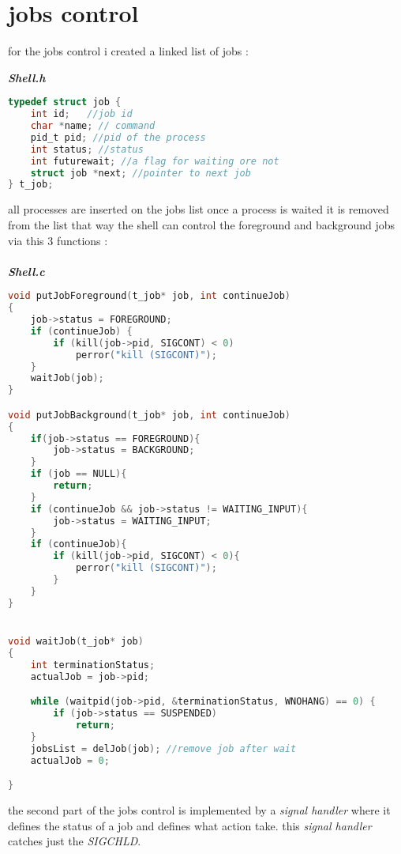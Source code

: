 \documentclass[paper=a4, fontsize=11pt]{scrartcl}
\numberwithin{equation}{section}		%
\numberwithin{figure}{section}			%
\numberwithin{table}{section}				%
\begin{document}
\pagebreak

\section{jobs control}
	
for the jobs control i created a linked list of jobs :


\textbf{\emph{Shell.h}}
\begin{lstlisting}[language=c]
typedef struct job {
	int id;   //job id
	char *name; // command
	pid_t pid; //pid of the process
	int status; //status
	int futurewait; //a flag for waiting ore not
	struct job *next; //pointer to next job
} t_job;
\end{lstlisting}

all processes are inserted on the jobs list once a process is waited it is removed from the list
that way the shell can control the foreground and background jobs via this 3 functions :
\\
\\

\textbf{\emph{Shell.c}}
\begin{lstlisting}[language=c]
void putJobForeground(t_job* job, int continueJob)
{
    job->status = FOREGROUND;
    if (continueJob) {
        if (kill(job->pid, SIGCONT) < 0)
            perror("kill (SIGCONT)");
    }
    waitJob(job);
}

void putJobBackground(t_job* job, int continueJob)
{
    if(job->status == FOREGROUND){
        job->status = BACKGROUND;
    }
    if (job == NULL){
        return;
    }
    if (continueJob && job->status != WAITING_INPUT){
        job->status = WAITING_INPUT;
    }
    if (continueJob){
        if (kill(job->pid, SIGCONT) < 0){
            perror("kill (SIGCONT)");
        }
    }
}


void waitJob(t_job* job)
{ 
    int terminationStatus;
    actualJob = job->pid;

    while (waitpid(job->pid, &terminationStatus, WNOHANG) == 0) {
        if (job->status == SUSPENDED)
            return;
    }
    jobsList = delJob(job); //remove job after wait
    actualJob = 0;

}

\end{lstlisting}

the second part of the jobs control is implemented by a \emph{signal handler} where it defines the status of a job and defines what action take.
this \emph{signal handler} catches just the \emph{SIGCHLD}.
\\
\\
\end{document}

